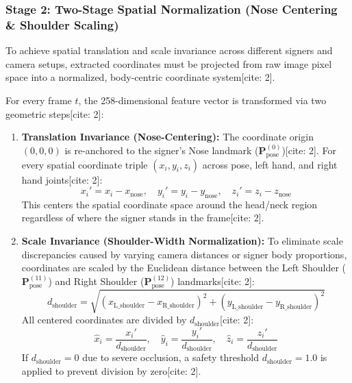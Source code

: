 \documentclass[12pt,a4paper]{article}
\begin{document}
\subsubsection{Stage 2: Two-Stage Spatial Normalization (Nose Centering \& Shoulder Scaling)}

To achieve spatial translation and scale invariance across different signers and camera setups, extracted coordinates must be projected from raw image pixel space into a normalized, body-centric coordinate system[cite: 2].

For every frame $t$, the 258-dimensional feature vector is transformed via two geometric steps[cite: 2]:

\begin{enumerate}
    \item \textbf{Translation Invariance (Nose-Centering):} The coordinate origin $(0, 0, 0)$ is re-anchored to the signer's Nose landmark ($\mathbf{P}_{\text{pose}}^{(0)}$)[cite: 2]. For every spatial coordinate triple $(x_i, y_i, z_i)$ across pose, left hand, and right hand joints[cite: 2]:
    \begin{equation}
    x_i' = x_i - x_{\text{nose}}, \quad y_i' = y_i - y_{\text{nose}}, \quad z_i' = z_i - z_{\text{nose}}
    \end{equation}
    This centers the spatial coordinate space around the head/neck region regardless of where the signer stands in the frame[cite: 2].

    \item \textbf{Scale Invariance (Shoulder-Width Normalization):} To eliminate scale discrepancies caused by varying camera distances or signer body proportions, coordinates are scaled by the Euclidean distance between the Left Shoulder ($\mathbf{P}_{\text{pose}}^{(11)}$) and Right Shoulder ($\mathbf{P}_{\text{pose}}^{(12)}$) landmarks[cite: 2]:
    \begin{equation}
    d_{\text{shoulder}} = \sqrt{(x_{\text{L\_shoulder}} - x_{\text{R\_shoulder}})^2 + (y_{\text{L\_shoulder}} - y_{\text{R\_shoulder}})^2}
    \end{equation}
    All centered coordinates are divided by $d_{\text{shoulder}}$[cite: 2]:
    \begin{equation}
    \hat{x}_i = \frac{x_i'}{d_{\text{shoulder}}}, \quad \hat{y}_i = \frac{y_i'}{d_{\text{shoulder}}}, \quad \hat{z}_i = \frac{z_i'}{d_{\text{shoulder}}}
    \end{equation}
    If $d_{\text{shoulder}} = 0$ due to severe occlusion, a safety threshold $d_{\text{shoulder}} = 1.0$ is applied to prevent division by zero[cite: 2].
\end{enumerate}
\end{document}
